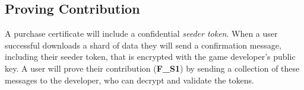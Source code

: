 \subsection*{Proving Contribution}

A purchase certificate will include a confidential \textit{seeder token}. When a user successful downloads a shard of data they will send a confirmation message, including their seeder token, that is encrypted with the game developer's public key. A user will prove their contribution (\textbf{F\_S1}) by sending a collection of these messages to the developer, who can decrypt and validate the tokens.
